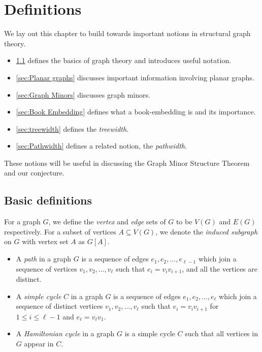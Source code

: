 \chapter{Definitions}\label{chap:Definitions}
We lay out this chapter to build towards important notions in structural graph theory.
\begin{itemize}
	\item \cref{sec: Basic definitions} defines the basics of graph theory and introduces useful notation.
	\item \cref{sec:Planar graphs} discusses important information involving planar graphs.
	\item \cref{sec:Graph Minors} discusses graph minors.
	\item \cref{sec:Book Embedding} defines what a book-embedding is and its importance.
	\item \cref{sec:treewidth} defines the \textit{treewidth}.
	\item \cref{sec:Pathwidth} defines a related notion, the \textit{pathwidth}.
\end{itemize}
These notions will be useful in discussing the Graph Minor Structure Theorem and our conjecture.
\section{Basic definitions}\label{sec: Basic definitions}
For a graph \(G\), we define the \textit{vertex} and \textit{edge} sets of \(G\) to be \(V(G)\) and \(E(G)\) respectively.
For a subset of vertices \(A \subseteq V(G)\), we denote the \textit{induced subgraph} on \(G\) with vertex set \(A\) as \(G[A]\).

\begin{itemize}
	\item A \textit{path} in a graph \(G\) is a sequence of edges \(e_1, e_2, \ldots, e_{\ell- 1}\) which join a sequence of vertices \(v_1, v_2, \ldots, v_{\ell}\) such that \(e_i = v_i v_{i + 1}\), and all the vertices are distinct.
	\item A \textit{simple cycle} \(C\) in a graph \(G\) is a sequence of edges \(e_1, e_2, \ldots, e_{\ell}\) which join a sequence of distinct vertices \(v_1, v_2, \ldots, v_{\ell}\) such that \(e_i = v_i v_{i + 1}\) for \(1 \leq i \leq \ell - 1\) and \(e_\ell = v_\ell v_1\).
	\item A \textit{Hamiltonian cycle} in a graph \(G\) is a simple cycle \(C\) such that all vertices in \(G\) appear in \(C\).
\end{itemize}

